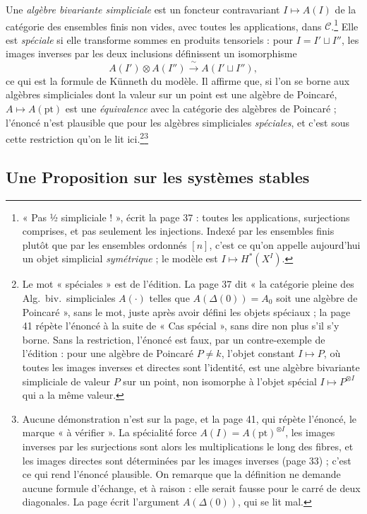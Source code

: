 \documentclass[11pt,a4paper]{article}
\begin{document}
Une \emph{algèbre bivariante simpliciale} est un foncteur contravariant
$I \mapsto A(I)$ de la catégorie des ensembles finis non vides, avec toutes
les applications, dans $\mathcal{C}$.\footnote{« Pas ½ simpliciale ! », écrit
la page 37 : toutes les applications, surjections comprises, et pas seulement
les injections. Indexé par les ensembles finis plutôt que par les ensembles
ordonnés $[n]$, c'est ce qu'on appelle aujourd'hui un objet simplicial
\emph{symétrique} ; le modèle est $I \mapsto H^{*}(X^{I})$.} Elle est
\emph{spéciale} si elle transforme sommes en produits tensoriels : pour
$I = I' \sqcup I''$, les images inverses par les deux inclusions définissent un
isomorphisme
\[ A(I') \otimes A(I'') \xrightarrow{\ \sim\ } A(I' \sqcup I'') , \]
ce qui est la formule de Künneth du modèle. Il affirme que, si l'on se borne
aux algèbres simpliciales dont la valeur sur un point est une algèbre de
Poincaré, $A \mapsto A(\mathrm{pt})$ est une \emph{équivalence} avec la
catégorie des algèbres de Poincaré ; l'énoncé n'est plausible que pour les
algèbres simpliciales \emph{spéciales}, et c'est sous cette restriction qu'on
le lit ici.\footnote{Le mot « spéciales » est de l'édition. La page 37 dit
« la catégorie pleine des Alg.\ biv.\ simpliciales $A(\cdot)$ telles que
$A(\Delta(0)) = A_{0}$ soit une algèbre de Poincaré », sans le mot, juste après
avoir défini les objets spéciaux ; la page 41 répète l'énoncé à la suite de
« Cas spécial », sans dire non plus s'il s'y borne. Sans la restriction,
l'énoncé est faux, par un contre-exemple de l'édition : pour une algèbre de
Poincaré $P \neq k$, l'objet constant $I \mapsto P$, où toutes les images
inverses et directes sont l'identité, est une algèbre bivariante simpliciale de
valeur $P$ sur un point, non isomorphe à l'objet spécial
$I \mapsto P^{\otimes I}$ qui a la même valeur.}\footnote{Aucune démonstration n'est sur
la page, et la page 41, qui répète l'énoncé, le marque « à vérifier ». La
spécialité force $A(I) = A(\mathrm{pt})^{\otimes I}$, les images inverses par
les surjections sont alors les multiplications le long des fibres, et les
images directes sont déterminées par les images inverses (page 33) ; c'est ce
qui rend l'énoncé plausible. On remarque que la définition ne demande aucune
formule d'échange, et à raison : elle serait fausse pour le carré de deux
diagonales. La page écrit l'argument $A(\Delta(0))$, qui se lit mal.}

\subsection*{Une Proposition sur les systèmes stables}
\end{document}
